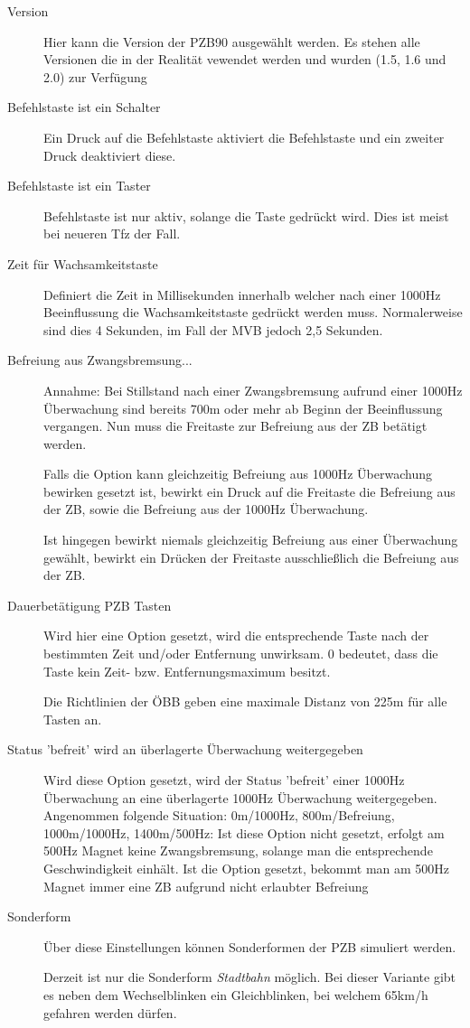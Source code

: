 \begin{description}
\item[Version]
Hier kann die Version der PZB90 ausgewählt werden. Es stehen alle
Versionen die in der Realität vewendet werden und wurden (1.5, 1.6 und
2.0) zur Verfügung
\item[Befehlstaste ist ein Schalter]
Ein Druck auf die Befehlstaste aktiviert die Befehlstaste und ein
zweiter Druck deaktiviert diese.
\item[Befehlstaste ist ein Taster]
Befehlstaste ist nur aktiv, solange die Taste gedrückt wird. Dies ist
meist bei neueren Tfz der Fall.
\item[Zeit für Wachsamkeitstaste]
Definiert die Zeit in Millisekunden innerhalb welcher nach einer 1000Hz
Beeinflussung die Wachsamkeitstaste gedrückt werden muss. Normalerweise
sind dies 4 Sekunden, im Fall der MVB jedoch 2,5 Sekunden.
\item[Befreiung aus Zwangsbremsung...]
Annahme: Bei Stillstand nach einer Zwangsbremsung aufrund einer 1000Hz
Überwachung sind bereits 700m oder mehr ab Beginn der Beeinflussung
vergangen. Nun muss die Freitaste zur Befreiung aus der ZB betätigt
werden.

Falls die Option kann gleichzeitig Befreiung aus 1000Hz Überwachung
bewirken gesetzt ist, bewirkt ein Druck auf die Freitaste die Befreiung
aus der ZB, sowie die Befreiung aus der 1000Hz Überwachung.

Ist hingegen bewirkt niemals gleichzeitig Befreiung aus einer
Überwachung gewählt, bewirkt ein Drücken der Freitaste ausschließlich
die Befreiung aus der ZB.
\item[Dauerbetätigung PZB Tasten]
Wird hier eine Option gesetzt, wird die entsprechende Taste nach der
bestimmten Zeit und/oder Entfernung unwirksam. 0 bedeutet, dass die
Taste kein Zeit- bzw. Entfernungsmaximum besitzt.

Die Richtlinien der ÖBB geben eine maximale Distanz von 225m für alle
Tasten an.
\item[Status 'befreit' wird an überlagerte Überwachung weitergegeben]
Wird diese Option gesetzt, wird der Status 'befreit' einer 1000Hz
Überwachung an eine überlagerte 1000Hz Überwachung weitergegeben.
Angenommen folgende Situation: 0m/1000Hz, 800m/Befreiung, 1000m/1000Hz,
1400m/500Hz: Ist diese Option nicht gesetzt, erfolgt am 500Hz Magnet
keine Zwangsbremsung, solange man die entsprechende Geschwindigkeit
einhält. Ist die Option gesetzt, bekommt man am 500Hz Magnet immer eine
ZB aufgrund nicht erlaubter Befreiung
\item[Sonderform]
Über diese Einstellungen können Sonderformen der PZB simuliert werden.

Derzeit ist nur die Sonderform \emph{Stadtbahn} möglich. Bei dieser
Variante gibt es neben dem Wechselblinken ein Gleichblinken, bei welchem
65km/h gefahren werden dürfen.
\end{description}

